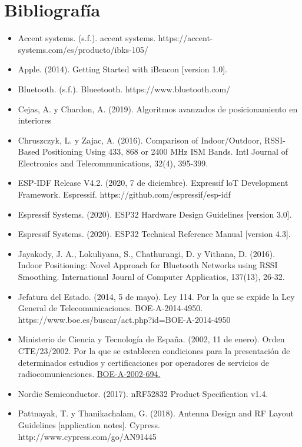 \documentclass[paper=a4, fontsize=11pt,twoside]{scrartcl}	%
\begin{document}
\section{Bibliografía}
    \begin{itemize}
        \item Accent systems. (s.f.). accent systems. https://accent-systems.com/es/producto/ibks-105/ 
        \item Apple. (2014). Getting Started with iBeacon [version 1.0].
        \item Bluetooth. (s.f.). Blueetooth. https://www.bluetooth.com/ 
        \item Cejas, A. y Chardon, A. (2019). Algoritmos avanzados de posicionamiento en interiores
        \item Chruszczyk, L. y Zajac, A. (2016). Comparison of Indoor/Outdoor, RSSI-Based Positioning Using 433, 868 or 2400 MHz ISM Bands. Intl Journal of Electronics and Telecommunications, 32(4), 395-399.
        \item ESP-IDF Release V4.2. (2020, 7 de diciembre). Expressif loT Development Framework. Espressif. https://github.com/espressif/esp-idf 
        \item Espressif Systems. (2020). ESP32 Hardware Design Guidelines [version 3.0].
        \item Espressif Systems. (2020). ESP32 Technical Reference Manual [version 4.3].
        \item Jayakody, J. A., Lokuliyana, S., Chathurangi, D. y Vithana, D. (2016). Indoor Positioning:
         Novel Approach for Bluetooth Networks using RSSI Smoothing. International Journl of Computer Applicatios, 137(13), 26-32.
        \item Jefatura del Estado. (2014, 5 de mayo). Ley 114. Por la que se expide la Ley General de
        Telecomunicaciones. BOE-A-2014-4950. https://www.boe.es/buscar/act.php?id=BOE-A-2014-4950 
        \item Ministerio de Ciencia y Tecnología de España. (2002, 11 de enero). Orden CTE/23/2002. Por la que se establecen condiciones para la presentación de determinados estudios y certificaciones por
        operadores de servicios de radiocomunicaciones.  \href{https://www.boe.es/diario_boe/txt.php?id=BOE-A-2002-694}{BOE-A-2002-694.}
        \item Nordic Semiconductor. (2017). nRF52832 Product Specification v1.4.
        \item Pattnayak, T. y Thanikachalam, G. (2018). Antenna Design and RF Layout Guidelines [application notes]. Cypress. http://www.cypress.com/go/AN91445 

\end{itemize}
\end{document}

